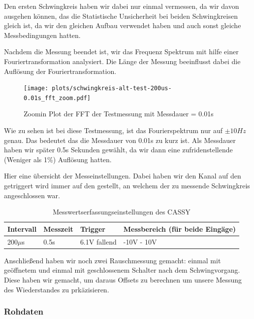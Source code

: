 \documentclass[twoside]{protokoll}
\begin{document}
Den ersten Schwingkreis haben wir dabei nur einmal vermessen, da wir davon ausgehen können, das die Statistische Unsicherheit bei beiden Schwingkreisen gleich ist, da wir den gleichen Aufbau verwendet haben und auch sonst gleiche Messbedingungen hatten.



Nachdem die Messung beendet ist, wir das Frequenz Spektrum mit hilfe einer Fouriertransformation analysiert.
Die Länge der Messung beeinflusst dabei die Auflösung der Fouriertransformation.
 
\begin{figure}[H]
    \centering
    \texttt{[image: plots/schwingkreis-alt-test-200us-0.01s\_fft\_zoom.pdf]}
    \caption{Zoomin Plot der FFT der Testmessung mit Messdauer = 0.01s}
\end{figure}
Wie zu sehen ist bei diese Testmessung, ist das Fourierspektrum nur auf $ \pm 10Hz $ genau. Das bedeutet das die Messdauer von 0.01s zu kurz ist.
Als Messdauer haben wir später 0.5s Sekunden gewählt, da wir dann eine zufridenstellende (Weniger als 1\%) Auflösung hatten.

Hier eine übersicht der Messeinstellungen. Dabei haben wir den Kanal auf den getriggert wird immer auf den gestellt, an welchem der zu messende Schwingkreis angeschlossen war.
\begin{table}[H]
        \centering
        \begin{tabularx}{1\textwidth}{X X X X} %
            \toprule
            \textbf{Intervall} & \textbf{Messzeit} & \textbf{Trigger} & \textbf{Messbereich (für beide Eingäge)} \\
            \midrule
            200$\mu$s  & 0.5s & 6.1V fallend & -10V - 10V \\
            \bottomrule
        \end{tabularx}
        \caption{Messwertserfassungseinstellungen des CASSY}
        \label{tab:mytable}
    \end{table}
     
Anschließend haben wir noch zwei Rauschmessung gemacht: einmal mit geöffnetem und einmal mit geschlossenem Schalter nach dem Schwingvorgang.
Diese haben wir gemacht, um daraus Offsets zu berechnen um unsere Messung des Wiederstandes zu prkäzisieren.


\subsubsection{Rohdaten}
\end{document}
